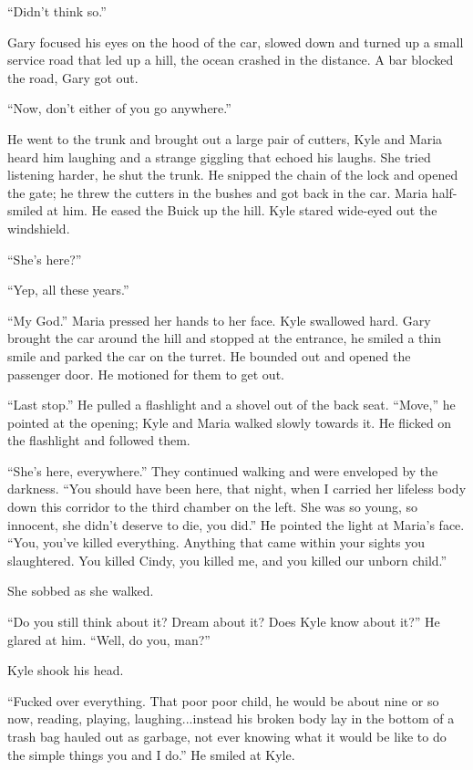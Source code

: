 ``Didn't think so.''

Gary focused his eyes on the hood of the car, slowed down and turned up
a small service road that led up a hill, the ocean crashed in the
distance. A bar blocked the road, Gary got out.

``Now, don't either of you go anywhere.''

He went to the trunk and brought out a large pair of cutters, Kyle and
Maria heard him laughing and a strange giggling that echoed his laughs.
She tried listening harder, he shut the trunk. He snipped the chain of
the lock and opened the gate; he threw the cutters in the bushes and got
back in the car. Maria half-smiled at him. He eased the Buick up the
hill. Kyle stared wide-eyed out the windshield.

``She's here?''

``Yep, all these years.''

``My God.'' Maria pressed her hands to her face. Kyle swallowed hard.
Gary brought the car around the hill and stopped at the entrance, he
smiled a thin smile and parked the car on the turret. He bounded out and
opened the passenger door. He motioned for them to get out.

``Last stop.'' He pulled a flashlight and a shovel out of the back seat.
``Move,'' he pointed at the opening; Kyle and Maria walked slowly
towards it. He flicked on the flashlight and followed them.

``She's here, everywhere.'' They continued walking and were enveloped by
the darkness. ``You should have been here, that night, when I carried
her lifeless body down this corridor to the third chamber on the left.
She was so young, so innocent, she didn't deserve to die, you did.'' He
pointed the light at Maria's face. ``You, you've killed everything.
Anything that came within your sights you slaughtered. You killed Cindy,
you killed me, and you killed our unborn child.''

She sobbed as she walked.

``Do you still think about it? Dream about it? Does Kyle know about
it?'' He glared at him. ``Well, do you, man?''

Kyle shook his head.

``Fucked over everything. That poor poor child, he would be about nine
or so now, reading, playing, laughing...instead his broken body lay in
the bottom of a trash bag hauled out as garbage, not ever knowing what
it would be like to do the simple things you and I do.'' He smiled at
Kyle.

